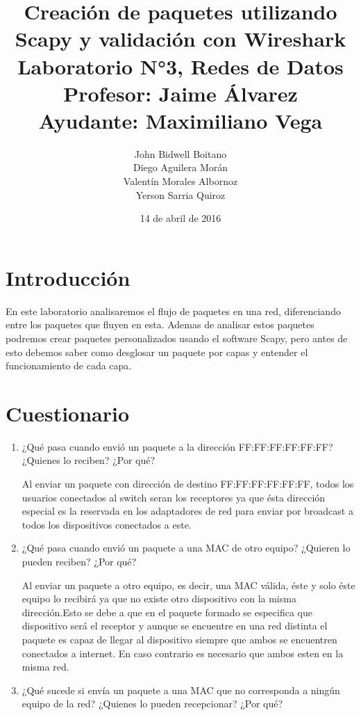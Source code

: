 \documentclass[spanish]{udpreport}
\begin{document}
\title{
	Creación de paquetes utilizando Scapy y validación con Wireshark\\[2ex]
	\normalsize
	Laboratorio N°3, Redes de Datos\\
    Profesor: Jaime Álvarez\\
	Ayudante: Maximiliano Vega
    }
\author{John Bidwell Boitano\\ Diego Aguilera Morán \\ Valentín Morales Albornoz \\ Yerson Sarria Quiroz}
\date{14 de abril de 2016}
\maketitle

\tableofcontents

\chapter{Introducción}
En este laboratorio analisaremos el flujo de paquetes en una red, diferenciando entre los paquetes que fluyen en esta.
Ademas de analisar estos paquetes podremos crear paquetes personalizados usando el software Scapy, pero antes de esto debemos saber como desglosar un paquete por capas y entender el funcionamiento de cada capa.
\chapter{Cuestionario}
\begin{enumerate}

\item¿Qué  pasa  cuando  envió  un  paquete  a  la  dirección  FF:FF:FF:FF:FF:FF?  ¿Quienes 
lo reciben? ¿Por qué?

Al enviar un paquete con dirección de destino FF:FF:FF:FF:FF:FF, todos los usuarios conectados al switch seran los receptores ya que ésta dirección especial es la reservada en los adaptadores de red para enviar por broadcast a todos los dispositivos conectados a este.

\item¿Qué  pasa  cuando  envió  un  paquete  a  una  MAC  de  otro  equipo?  ¿Quieren  lo pueden reciben? ¿Por qué?

Al enviar un paquete a otro equipo, es decir, una MAC válida, éste y solo éste equipo lo recibirá ya que no existe otro dispositivo con la misma dirección.Esto se debe a que en el paquete formado se especifica que dispositivo será el receptor y aunque se encuentre en una red distinta el paquete es capaz de llegar al dispositivo siempre que ambos se encuentren conectados a internet. En caso contrario es necesario que ambos esten en la misma red.

\item¿Qué  sucede  si  envía  un  paquete  a  una  MAC  que  no  corresponda  a  ningún  equipo de la red? ¿Quienes lo pueden recepcionar? ¿Por qué?
\end{enumerate}

\end{document}
